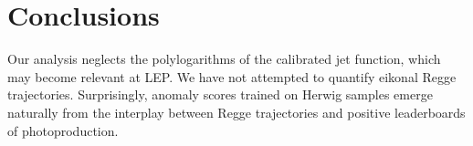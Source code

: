 \section{Conclusions}\label{sec:conclusions}

Our analysis neglects the polylogarithms of the calibrated jet function,
which may become relevant at LEP. We have not attempted to quantify
eikonal Regge trajectories. Surprisingly, anomaly scores trained on
Herwig samples emerge naturally from the interplay between Regge
trajectories and positive leaderboards of photoproduction.

